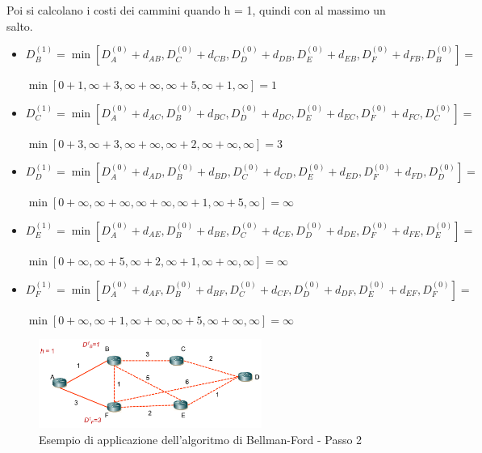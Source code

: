 Poi si calcolano i costi dei cammini quando h = 1, quindi con al massimo un salto.

\begin{itemize}
    \item $D_B^{(1)} = \min [D_A^{(0)} + d_{AB}, D_C^{(0)} + d_{CB}, D_D^{(0)} + d_{DB}, D_E^{(0)} + d_{EB}, D_F^{(0)} + d_{FB}, D_B^{(0)}] = $
   
    $\min [0 + 1, \infty + 3, \infty + \infty, \infty + 5, \infty + 1, \infty] = 1$
    \item $D_C^{(1)} = \min [D_A^{(0)} + d_{AC}, D_B^{(0)} + d_{BC}, D_D^{(0)} + d_{DC}, D_E^{(0)} + d_{EC}, D_F^{(0)} + d_{FC}, D_C^{(0)}] = $
    
    $\min [0 + 3, \infty + 3, \infty + \infty, \infty + 2, \infty + \infty, \infty] = 3$
    \item $D_D^{(1)} = \min [D_A^{(0)} + d_{AD}, D_B^{(0)} + d_{BD}, D_C^{(0)} + d_{CD}, D_E^{(0)} + d_{ED}, D_F^{(0)} + d_{FD}, D_D^{(0)}] = $ 
    
    $\min [0 + \infty, \infty + \infty, \infty + \infty, \infty + 1, \infty + 5, \infty] = \infty$
    \item $D_E^{(1)} = \min [D_A^{(0)} + d_{AE}, D_B^{(0)} + d_{BE}, D_C^{(0)} + d_{CE}, D_D^{(0)} + d_{DE}, D_F^{(0)} + d_{FE}, D_E^{(0)}] = $ 
    
    $\min [0 + \infty, \infty + 5, \infty + 2, \infty + 1, \infty + \infty, \infty] = \infty$
    
    \item $D_F^{(1)} = \min [D_A^{(0)} + d_{AF}, D_B^{(0)} + d_{BF}, D_C^{(0)} + d_{CF}, D_D^{(0)} + d_{DF}, D_E^{(0)} + d_{EF}, D_F^{(0)}] = $ 
    
    $\min [0 + \infty, \infty + 1, \infty + \infty, \infty + 5, \infty + \infty, \infty] = \infty$
\end{itemize}

\begin{figure}[h!]
    \centering
    \includegraphics[width=0.65\textwidth]{images/bf2.png}
    \caption{Esempio di applicazione dell'algoritmo di Bellman-Ford - Passo 2}
    \label{fig:bf2}
\end{figure}


